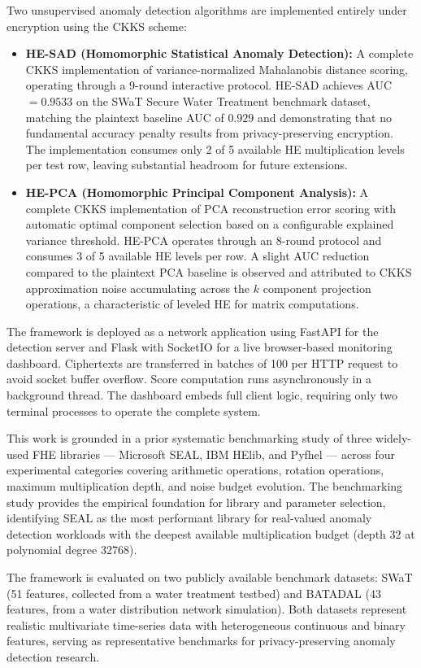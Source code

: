 Two unsupervised anomaly detection algorithms are implemented entirely under
encryption using the CKKS scheme:

\begin{itemize}
  \item \textbf{HE-SAD (Homomorphic Statistical Anomaly Detection):}
  A complete CKKS implementation of variance-normalized Mahalanobis distance
  scoring, operating through a 9-round interactive protocol. HE-SAD achieves
  AUC $= 0.9533$ on the SWaT Secure Water Treatment benchmark dataset,
  matching the plaintext baseline AUC of $0.929$ and demonstrating that no
  fundamental accuracy penalty results from privacy-preserving encryption.
  The implementation consumes only 2 of 5 available HE multiplication levels
  per test row, leaving substantial headroom for future extensions.

  \item \textbf{HE-PCA (Homomorphic Principal Component Analysis):}
  A complete CKKS implementation of PCA reconstruction error scoring with
  automatic optimal component selection based on a configurable explained
  variance threshold. HE-PCA operates through an 8-round protocol and
  consumes 3 of 5 available HE levels per row. A slight AUC reduction
  compared to the plaintext PCA baseline is observed and attributed to CKKS
  approximation noise accumulating across the $k$ component projection
  operations, a characteristic of leveled HE for matrix computations.
\end{itemize}

The framework is deployed as a network application using FastAPI for the
detection server and Flask with SocketIO for a live browser-based monitoring
dashboard. Ciphertexts are transferred in batches of 100 per HTTP request
to avoid socket buffer overflow. Score computation runs asynchronously in a
background thread. The dashboard embeds full client logic, requiring only two
terminal processes to operate the complete system.

This work is grounded in a prior systematic benchmarking study of three
widely-used FHE libraries --- Microsoft SEAL, IBM HElib, and Pyfhel ---
across four experimental categories covering arithmetic operations, rotation
operations, maximum multiplication depth, and noise budget evolution. The
benchmarking study provides the empirical foundation for library and parameter
selection, identifying SEAL as the most performant library for real-valued
anomaly detection workloads with the deepest available multiplication budget
(depth 32 at polynomial degree 32768).

The framework is evaluated on two publicly available benchmark datasets: SWaT
(51 features, collected from a water treatment testbed) and BATADAL (43
features, from a water distribution network simulation). Both datasets represent
realistic multivariate time-series data with heterogeneous continuous and binary
features, serving as representative benchmarks for privacy-preserving anomaly
detection research.

\endgroup
